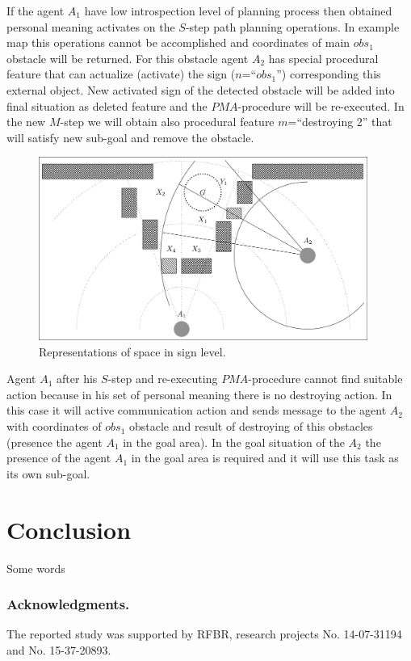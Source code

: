 \documentclass[runningheads,a4paper]{llncs}
\begin{document}
If the agent $A_1$ have low introspection level of planning process then obtained personal meaning activates on the $S$-step path planning operations. In example map this operations cannot be accomplished and coordinates of main $obs_1$ obstacle will be returned. For this obstacle agent $A_2$ has special procedural feature that can actualize (activate) the sign ($n$=``$obs_1$'') corresponding this external object. New activated sign of the detected obstacle will be added into final situation as deleted feature and the $PMA$-procedure will be re-executed. In the new $M$-step we will obtain also procedural feature $m$=``destroying 2'' that will satisfy new sub-goal and remove the obstacle.

\begin{figure}
	\centering
	\includegraphics[height=6cm]{rita_ex_proc}
	\caption{Representations of space in sign level.}
	\label{fig:example}
\end{figure}

Agent $A_1$ after his $S$-step and re-executing $PMA$-procedure cannot find suitable action because in his set of personal meaning there is no destroying action. In this case it will active communication action and sends message to the agent $A_2$ with coordinates of $obs_1$ obstacle and result of destroying of this obstacles (presence the agent $A_1$ in the goal area). In the goal situation of the $A_2$ the presence of the agent $A_1$ in the goal area is required and it will use this task as its own sub-goal.

\section{Conclusion}

Some words

\subsubsection*{Acknowledgments.} The reported study was supported by RFBR, research projects No. 14-07-31194 and No. 15-37-20893.
\end{document}

